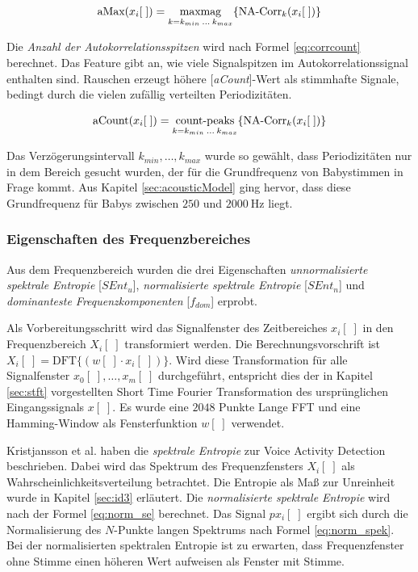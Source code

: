 \begin{equation}
\text{aMax}(x_i[\;]) = \operatorname*{max mag}_{k = k_{min} \: \ldots \: k_{max}}\{\text{NA-Corr}_k(x_i[\;])\}
\label{eq:corrpeak}
\end{equation}

Die \emph{Anzahl der Autokorrelationsspitzen} wird nach Formel \ref{eq:corrcount} berechnet. Das Feature gibt an, wie viele Signalspitzen im Autokorrelationssignal enthalten sind. Rauschen erzeugt höhere [\emph{aCount}]-Wert als stimmhafte Signale, bedingt durch die vielen zufällig verteilten Periodizitäten.\cite[S. 1 - 2]{vad_Lisboa}

\begin{equation}
\text{aCount}(x_i[\;]) = \operatorname*{count-peaks}_{k = k_{min} \: \ldots \: k_{max}}\{\text{NA-Corr}_k(x_i[\;])\}
\label{eq:corrcount}
\end{equation}

Das Verzögerungsintervall $k_{min} , \ldots , k_{max}$ wurde so gewählt, dass Periodizitäten nur in dem Bereich gesucht wurden, der für die Grundfrequenz von Babystimmen in Frage kommt. Aus Kapitel \ref{sec:acousticModel} ging hervor, dass diese Grundfrequenz für Babys zwischen $250$ und $\SI{2000}{\hertz}$ liegt.

\subsubsection{Eigenschaften des Frequenzbereiches}

Aus dem Frequenzbereich wurden die drei Eigenschaften \emph{unnormalisierte spektrale Entropie} [$SEnt_{u}$], \emph{normalisierte spektrale Entropie}  [$SEnt_{n}$] und \emph{dominanteste Frequenzkomponenten} [$f_{dom}$] erprobt.\cite{vad_Lisboa}

Als Vorbereitungsschritt wird das Signalfenster des Zeitbereiches $x_i[\;]$ in den Frequenzbereich $X_i[\;]$ transformiert werden. Die Berechnungsvorschrift ist $X_i[\;] = \text{DFT}\{(w[\;] \cdot x_i[\;])\}$. Wird diese Transformation für alle Signalfenster $x_0[\;], \ldots, x_m[\;]$ durchgeführt, entspricht dies der in Kapitel \ref{sec:stft} vorgestellten Short Time Fourier Transformation des ursprünglichen Eingangssignals $x[\;]$. Es wurde eine $2048$ Punkte Lange FFT und eine Hamming-Window als Fensterfunktion $w[\;]$ verwendet.

Kristjansson et al. \cite[S. 2]{vad_Lisboa} haben die \emph{spektrale Entropie} zur Voice Activity Detection beschrieben. Dabei wird das Spektrum des Frequenzfensters $X_i[\;]$ als Wahrscheinlichkeitsverteilung betrachtet. Die Entropie als Maß zur \glqq Unreinheit\grqq{} wurde in Kapitel \ref{sec:id3} erläutert. Die \emph{normalisierte spektrale Entropie} wird nach der Formel \ref{eq:norm_se} berechnet. Das Signal $px_i[\;]$ ergibt sich durch die Normalisierung des $N$-Punkte langen Spektrums nach Formel \ref{eq:norm_spek}. Bei der normalisierten spektralen Entropie ist zu erwarten, dass Frequenzfenster ohne Stimme einen höheren Wert aufweisen als Fenster mit Stimme. 

